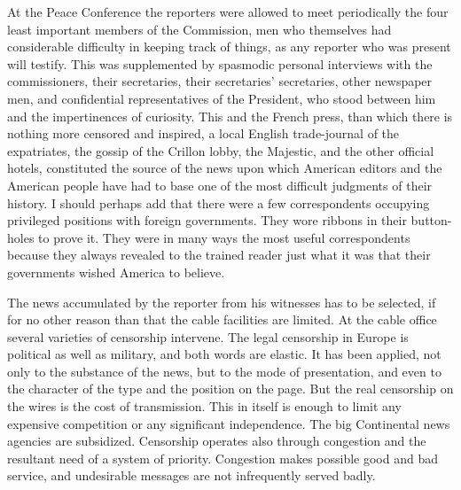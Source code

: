 \documentclass[openany,nobib,nohyper]{tufte-book}
\begin{document}
At the Peace Conference the reporters were allowed to meet periodically
the four least important members of the Commission, men who themselves
had considerable difficulty in keeping track of things, as any reporter
who was present will testify. This was supplemented by spasmodic
personal interviews with the commissioners, their secretaries, their
secretaries' secretaries, other newspaper men, and confidential
representatives of the President, who stood between him and the
impertinences of curiosity. This and the French press, than which there
is nothing more censored and inspired, a local English trade-journal of
the expatriates, the gossip of the Crillon lobby, the Majestic, and the
other official hotels, constituted the source of the news upon which
American editors and the American people have had to base one of the
most difficult judgments of their history. I should perhaps add that
there were a few correspondents occupying privileged positions with
foreign governments. They wore ribbons in their button-holes to prove
it. They were in many ways the most useful correspondents because they
always revealed to the trained reader just what it was that their
governments wished America to believe.

The news accumulated by the reporter from his witnesses has to be
selected, if for no other reason than that the cable facilities are
limited. At the cable office several varieties of censorship intervene.
The legal censorship in Europe is political as well as military, and
both words are elastic. It has been applied, not only to the substance
of the news, but to the mode of presentation, and even to the character
of the type and the position on the page. But the real censorship on the
wires is the cost of transmission. This in itself is enough to limit any
expensive competition or any significant independence. The big
Continental news agencies are subsidized. Censorship operates also
through congestion and the resultant need of a system of priority.
Congestion makes possible good and bad service, and undesirable messages
are not infrequently served badly.
\end{document}
